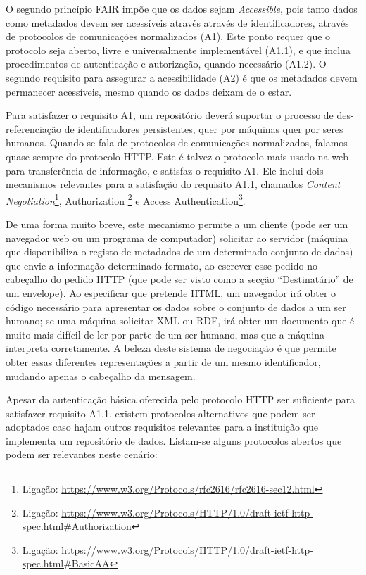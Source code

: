 \documentclass[sigconf,nonacm]{acmart}
\begin{document}
O segundo princípio FAIR impõe que os dados sejam \emph{Accessible}, pois tanto dados como metadados devem ser acessíveis através através de identificadores, através de protocolos de comunicações normalizados (A1). Este ponto requer que o protocolo seja aberto, livre e universalmente implementável (A1.1), e que inclua procedimentos de autenticação e autorização, quando necessário (A1.2). O segundo requisito para assegurar a acessibilidade (A2) é que os metadados devem permanecer acessíveis, mesmo quando os dados deixam de o estar.

Para satisfazer o requisito A1, um repositório deverá suportar o processo de des-referenciação de identificadores persistentes, quer por máquinas quer por seres humanos. Quando se fala de protocolos de comunicações normalizados, falamos quase sempre do protocolo HTTP. Este é talvez o protocolo mais usado na web para transferência de informação, e satisfaz o requisito A1. Ele inclui dois mecanismos relevantes para a satisfação do requisito A1.1, chamados \emph{Content Negotiation}\footnote{Ligação: \url{https://www.w3.org/Protocols/rfc2616/rfc2616-sec12.html}}, Authorization \footnote{Ligação: \url{https://www.w3.org/Protocols/HTTP/1.0/draft-ietf-http-spec.html\#Authorization}} e Access Authentication\footnote{Ligação: \url{https://www.w3.org/Protocols/HTTP/1.0/draft-ietf-http-spec.html\#BasicAA}}. 

De uma forma muito breve, este mecanismo permite a um cliente (pode ser um navegador web ou um programa de computador) solicitar ao servidor (máquina que disponibiliza o registo de metadados de um determinado conjunto de dados) que envie a informação determinado formato, ao escrever esse pedido no cabeçalho do pedido HTTP (que pode ser visto como a secção ``Destinatário'' de um envelope). Ao especificar que pretende HTML, um navegador irá obter o código necessário para apresentar os dados sobre o conjunto de dados a um ser humano; se uma máquina solicitar XML ou RDF, irá obter um documento que é muito mais difícil de ler por parte de um ser humano, mas que a máquina interpreta corretamente. A beleza deste sistema de negociação é que permite obter essas diferentes representações a partir de um mesmo identificador, mudando apenas o cabeçalho da mensagem.

Apesar da autenticação básica oferecida pelo protocolo HTTP ser suficiente para satisfazer requisito A1.1, existem protocolos alternativos que podem ser adoptados caso hajam outros requisitos relevantes para a instituição que implementa um repositório de dados. Listam-se alguns protocolos abertos que podem ser relevantes neste cenário:
\end{document}
